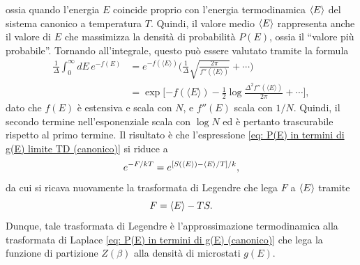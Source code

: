 ossia quando l'energia $E$ coincide proprio con l'energia termodinamica $\langle E \rangle$ del sistema canonico a temperatura $T$. Quindi, il valore medio $\langle E \rangle$ rappresenta anche il valore di $E$ che massimizza la densità di probabilità $P(E)$, ossia il ``valore più probabile''. Tornando all'integrale, questo può essere valutato tramite la formula
\begin{equation}
    \begin{split}
        \frac{1}{\Delta} \int_{0}^{\infty} dE \, e^{-f(E)} &= e^{-f(\langle E \rangle)}\bigg( \frac{1}{\Delta} \sqrt{\frac{2\pi}{f''(\langle E \rangle)}} + \cdots \bigg) \\
        &= \exp\bigg[{-f(\langle E \rangle) - \frac{1}{2} \log \frac{\Delta^2 f''(\langle E \rangle)}{2\pi}} + \cdots\bigg],
    \end{split}
\end{equation}
dato che $f(E)$ è estensiva e scala con $N$, e $f''(E)$ scala con $1/N$. Quindi, il secondo termine nell'esponenziale scala con $\log{N}$ ed è pertanto trascurabile rispetto al primo termine. Il risultato è che l'espressione \eqref{eq: P(E) in termini di g(E) limite TD (canonico)} si riduce a
\begin{equation}
    e^{-F/kT} = e^{[S(\langle E \rangle) - \langle E \rangle/T]/k},
\end{equation}
da cui si ricava nuovamente la trasformata di Legendre che lega $F$ a $\langle E \rangle$ tramite
\begin{equation}
    F = \langle E \rangle - TS.
\end{equation}
Dunque, tale trasformata di Legendre è l'approssimazione termodinamica alla trasformata di Laplace \eqref{eq: P(E) in termini di g(E) (canonico)} che lega la funzione di partizione $Z(\beta)$ alla densità di microstati $g(E)$.

